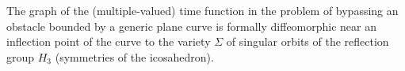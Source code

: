 The graph of the (multiple-valued) time function in the problem of bypassing an obstacle bounded by a generic plane curve is formally diffeomorphic near an inflection point of the curve to the variety $\Sigma$ of singular orbits of the reflection group $H_3$ (symmetries of the icosahedron).
